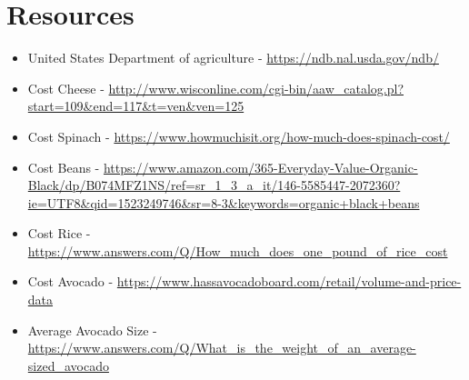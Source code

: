 \documentclass[paper=a4, fontsize=11pt]{scrartcl}
\numberwithin{equation}{section}		%
\numberwithin{figure}{section}			%
\numberwithin{table}{section}				%
\begin{document}
\section{Resources}

\begin{itemize}
\item United States Department of agriculture - \url{https://ndb.nal.usda.gov/ndb/}
\item Cost Cheese - \url{http://www.wisconline.com/cgi-bin/aaw_catalog.pl?start=109&end=117&t=ven&ven=125}
\item Cost Spinach - \url{https://www.howmuchisit.org/how-much-does-spinach-cost/}
\item Cost Beans - \url{https://www.amazon.com/365-Everyday-Value-Organic-Black/dp/B074MFZ1NS/ref=sr_1_3_a_it/146-5585447-2072360?ie=UTF8&qid=1523249746&sr=8-3&keywords=organic+black+beans}
\item Cost Rice - \url{https://www.answers.com/Q/How_much_does_one_pound_of_rice_cost}
\item Cost Avocado - \url{https://www.hassavocadoboard.com/retail/volume-and-price-data}
\item Average Avocado Size - \url{https://www.answers.com/Q/What_is_the_weight_of_an_average-sized_avocado}
  
\end{itemize}
\end{document}
